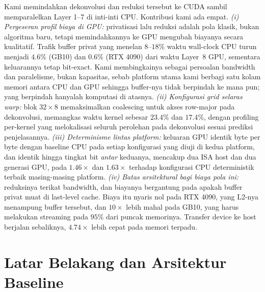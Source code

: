 \documentclass[conference]{IEEEtran}
\begin{document}
Kami memindahkan dekonvolusi dan reduksi tersebut ke CUDA sambil memparalelkan Layer 1--7 di inti-inti CPU. Kontribusi kami ada empat. \emph{(i) Pergeseran profil biaya di GPU:} privatisasi lalu reduksi adalah pola klasik, bukan algoritma baru, tetapi memindahkannya ke GPU mengubah biayanya secara kualitatif. Trafik buffer privat yang menelan $8$--$18\%$ waktu wall-clock CPU turun menjadi $4.6\%$ (GB10) dan $0.6\%$ (RTX 4090) dari waktu Layer~8 GPU, sementara keluarannya tetap bit-exact. Kami membingkainya sebagai persoalan bandwidth dan paralelisme, bukan kapasitas, sebab platform utama kami berbagi satu kolam memori antara CPU dan GPU sehingga buffer-nya tidak berpindah ke mana pun; yang berpindah hanyalah komputasi di atasnya. \emph{(ii) Konfigurasi grid selaras warp:} blok $32{\times}8$ memaksimalkan coalescing untuk akses row-major pada dekonvolusi, memangkas waktu kernel sebesar $23.4\%$ dan $17.4\%$, dengan profiling per-kernel yang melokalisasi seluruh perolehan pada dekonvolusi sesuai prediksi penjelasannya. \emph{(iii) Determinisme lintas platform:} keluaran GPU identik byte per byte dengan baseline CPU pada setiap konfigurasi yang diuji di kedua platform, dan identik hingga tingkat bit \emph{antar} keduanya, mencakup dua ISA host dan dua generasi GPU, pada $1.46\times$ dan $1.63\times$ terhadap konfigurasi CPU deterministik terbaik masing-masing platform. \emph{(iv) Batas arsitektural bagi biaya pola ini:} reduksinya terikat bandwidth, dan biayanya bergantung pada apakah buffer privat muat di last-level cache. Biaya itu nyaris nol pada RTX 4090, yang L2-nya menampung buffer tersebut, dan $10\times$ lebih mahal pada GB10, yang harus melakukan streaming pada $95\%$ dari puncak memorinya. Transfer device ke host berjalan sebaliknya, $4.74\times$ lebih cepat pada memori terpadu.

\section{Latar Belakang dan Arsitektur Baseline}
\end{document}
